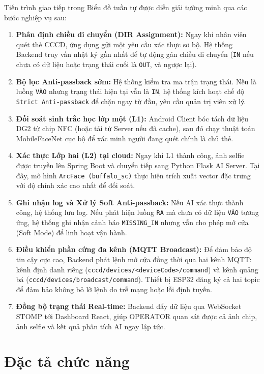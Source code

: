 \documentclass[../DoAn.tex]{subfiles}
\begin{document}
Tiến trình giao tiếp trong Biểu đồ tuần tự được diễn giải tường minh qua các bước nghiệp vụ sau:
\begin{enumerate}
    \item \textbf{Phân định chiều di chuyển (DIR Assignment):} Ngay khi nhân viên quét thẻ CCCD, ứng dụng gửi một yêu cầu xác thực sơ bộ. Hệ thống Backend truy vấn nhật ký gần nhất để tự động gán chiều di chuyển (\texttt{IN} nếu chưa có dữ liệu hoặc trạng thái cuối là \texttt{OUT}, và ngược lại). 
    \item \textbf{Bộ lọc Anti-passback sớm:} Hệ thống kiểm tra ma trận trạng thái. Nếu là luồng \texttt{VÀO} nhưng trạng thái hiện tại vẫn là \texttt{IN}, hệ thống kích hoạt chế độ \texttt{Strict Anti-passback} để chặn ngay từ đầu, yêu cầu quản trị viên xử lý.
    \item \textbf{Đối soát sinh trắc học lớp một (L1):} Android Client bóc tách dữ liệu DG2 từ chip NFC (hoặc tải từ Server nếu đã cache), sau đó chạy thuật toán MobileFaceNet cục bộ để xác minh người đang quét chính là chủ thẻ.
    \item \textbf{Xác thực Lớp hai (L2) tại cloud:} Ngay khi L1 thành công, ảnh selfie được truyền lên Spring Boot và chuyển tiếp sang Python Flask AI Server. Tại đây, mô hình \texttt{ArcFace (buffalo_sc)} thực hiện trích xuất vector đặc trưng với độ chính xác cao nhất để đối soát.
    \item \textbf{Ghi nhận log và Xử lý Soft Anti-passback:} Nếu AI xác thực thành công, hệ thống lưu log. Nếu phát hiện luồng \texttt{RA} mà chưa có dữ liệu \texttt{VÀO} tương ứng, hệ thống ghi nhận cảnh báo \texttt{MISSING\_IN} nhưng vẫn cho phép mở cửa (Soft Mode) để linh hoạt vận hành.
    \item \textbf{Điều khiển phần cứng đa kênh (MQTT Broadcast):} Để đảm bảo độ tin cậy cực cao, Backend phát lệnh mở cửa đồng thời qua hai kênh MQTT: kênh định danh riêng (\texttt{cccd/devices/<deviceCode>/command}) và kênh quảng bá (\texttt{cccd/devices/broadcast/command}). Thiết bị ESP32 đăng ký cả hai topic để đảm bảo không bỏ lỡ lệnh do trễ mạng hoặc lỗi định tuyến.
    \item \textbf{Đồng bộ trạng thái Real-time:} Backend đẩy dữ liệu qua WebSocket STOMP tới Dashboard React, giúp OPERATOR quan sát được cả ảnh chip, ảnh selfie và kết quả phân tích AI ngay lập tức.
\end{enumerate}

\section{Đặc tả chức năng}
\label{section:2.3}
\end{document}
